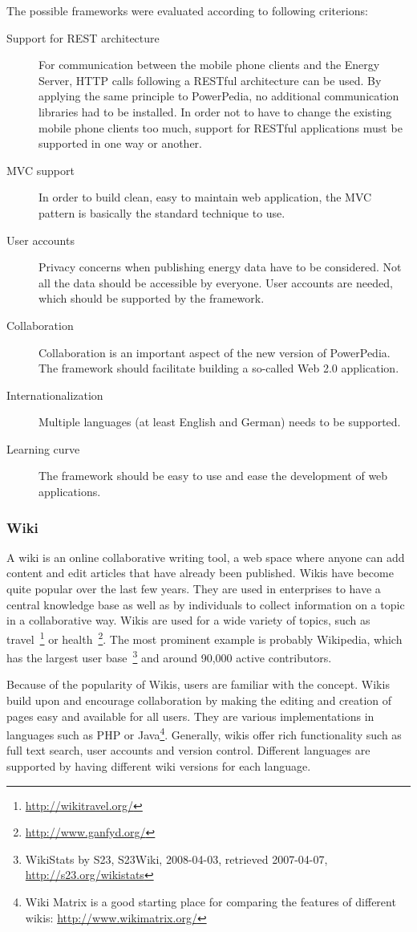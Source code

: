 The possible frameworks were evaluated according to following criterions:
\begin{description}
 \item[Support for REST architecture] For communication between the mobile phone clients and the Energy Server, HTTP calls following a RESTful architecture can be used. By applying the same principle to PowerPedia, no additional communication libraries had to be installed. In order not to have to change the existing mobile phone clients too much, support for RESTful applications must be supported in one way or another.
 \item[MVC support] In order to build clean, easy to maintain web application, the MVC pattern is basically the standard technique to use. 
 \item[User accounts] Privacy concerns when publishing energy data have to be considered. Not all the data should be accessible by everyone. User accounts are needed, which should be supported by the framework.
 \item[Collaboration] Collaboration is an important aspect of the new version of PowerPedia. The framework should facilitate building a so-called Web 2.0 application.
 \item[Internationalization] Multiple languages (at least English and German) needs to be supported.
 \item[Learning curve] The framework should be easy to use and ease the development of web applications. 
\end{description}

\subsubsection{Wiki}
A wiki is an online collaborative writing tool, a web space where anyone can add content and edit articles that have already been published\cite{wiki_collaboration}. Wikis have become quite popular over the last few years. They are used in enterprises to have a central knowledge base as well as by individuals to collect information on a topic in a collaborative way. Wikis are used for a wide variety of topics, such as travel~\footnote{\url{http://wikitravel.org/}} or health~\footnote{\url{http://www.ganfyd.org/}}. The most prominent example is probably Wikipedia, which has the largest user base~\footnote{WikiStats by S23, S23Wiki, 2008-04-03, retrieved 2007-04-07, \url{http://s23.org/wikistats}} and around 90,000 active contributors.

Because of the popularity of Wikis, users are familiar with the concept. Wikis build upon and encourage collaboration by making the editing and creation of pages easy and available for all users. They are various implementations in languages such as PHP or Java\footnote{Wiki Matrix is a good starting place for comparing the features of different wikis: \url{http://www.wikimatrix.org/}}. Generally, wikis offer rich functionality such as full text search, user accounts and version control. Different languages are supported by having different wiki versions for each language.  

